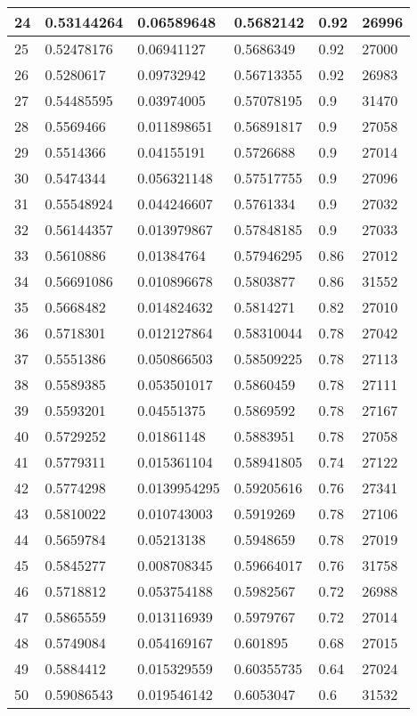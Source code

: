\begin{longtable}{|l|l|l|l|l|l|}
24 & 0.53144264 & 0.06589648 & 0.5682142 & 0.92 & 26996 \\ \hline 
25 & 0.52478176 & 0.06941127 & 0.5686349 & 0.92 & 27000 \\ \hline 
26 & 0.5280617 & 0.09732942 & 0.56713355 & 0.92 & 26983 \\ \hline 
27 & 0.54485595 & 0.03974005 & 0.57078195 & 0.9 & 31470 \\ \hline 
28 & 0.5569466 & 0.011898651 & 0.56891817 & 0.9 & 27058 \\ \hline 
29 & 0.5514366 & 0.04155191 & 0.5726688 & 0.9 & 27014 \\ \hline 
30 & 0.5474344 & 0.056321148 & 0.57517755 & 0.9 & 27096 \\ \hline 
31 & 0.55548924 & 0.044246607 & 0.5761334 & 0.9 & 27032 \\ \hline 
32 & 0.56144357 & 0.013979867 & 0.57848185 & 0.9 & 27033 \\ \hline 
33 & 0.5610886 & 0.01384764 & 0.57946295 & 0.86 & 27012 \\ \hline 
34 & 0.56691086 & 0.010896678 & 0.5803877 & 0.86 & 31552 \\ \hline 
35 & 0.5668482 & 0.014824632 & 0.5814271 & 0.82 & 27010 \\ \hline 
36 & 0.5718301 & 0.012127864 & 0.58310044 & 0.78 & 27042 \\ \hline 
37 & 0.5551386 & 0.050866503 & 0.58509225 & 0.78 & 27113 \\ \hline 
38 & 0.5589385 & 0.053501017 & 0.5860459 & 0.78 & 27111 \\ \hline 
39 & 0.5593201 & 0.04551375 & 0.5869592 & 0.78 & 27167 \\ \hline 
40 & 0.5729252 & 0.01861148 & 0.5883951 & 0.78 & 27058 \\ \hline 
41 & 0.5779311 & 0.015361104 & 0.58941805 & 0.74 & 27122 \\ \hline 
42 & 0.5774298 & 0.0139954295 & 0.59205616 & 0.76 & 27341 \\ \hline 
43 & 0.5810022 & 0.010743003 & 0.5919269 & 0.78 & 27106 \\ \hline 
44 & 0.5659784 & 0.05213138 & 0.5948659 & 0.78 & 27019 \\ \hline 
45 & 0.5845277 & 0.008708345 & 0.59664017 & 0.76 & 31758 \\ \hline 
46 & 0.5718812 & 0.053754188 & 0.5982567 & 0.72 & 26988 \\ \hline 
47 & 0.5865559 & 0.013116939 & 0.5979767 & 0.72 & 27014 \\ \hline 
48 & 0.5749084 & 0.054169167 & 0.601895 & 0.68 & 27015 \\ \hline 
49 & 0.5884412 & 0.015329559 & 0.60355735 & 0.64 & 27024 \\ \hline 
50 & 0.59086543 & 0.019546142 & 0.6053047 & 0.6 & 31532 \\ \hline 
\end{longtable}